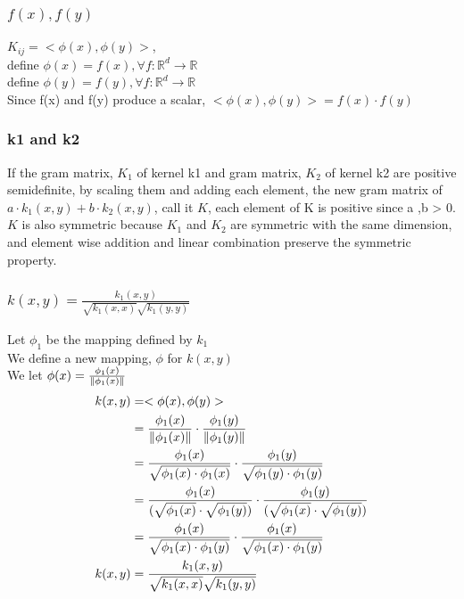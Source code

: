\documentclass[letterpaper, 12]{article}
\begin{document}
\subsubsection{$f(x), f(y)$}
$K_{ij} = <\phi (x),  \phi (y) >$, \\
define $\phi(x) = f(x), \forall f: \mathbb{R}^{d} \rightarrow \mathbb{R}$\\
define $\phi(y) = f(y), \forall f: \mathbb{R}^{d} \rightarrow \mathbb{R}$\\
Since f(x) and f(y) produce a scalar,  $<\phi (x),  \phi (y) > = f(x) \cdot f(y)$

\subsubsection{k1 and k2}
If the gram matrix, $K_{1}$ of kernel k1 and gram matrix, $K_{2}$ of kernel k2 are positive semidefinite, by scaling them and adding each element, the new gram matrix of $a \cdot k_{1}(x, y) + b \cdot k_{2}(x, y)$, call it $K$, each element of K is positive since a ,b > 0.\\
$K$ is also symmetric because $K_{1}$ and $K_{2}$ are symmetric with the same dimension, and element wise addition and linear combination preserve the symmetric property.\\

\subsubsection{$k(x, y) = \frac{k_{1}(x ,y) }{\sqrt{k_{1}(x, x)} \sqrt{k_{1}(y, y)} }$}
Let $\phi_{1}$ be the mapping defined by $k_{1}$\\
We define a new mapping, $\phi$ for $k(x ,y)$\\
We let $\phi(x) = \frac{\phi_{1} (x)}{\norm{\phi_{1}(x)}}$\\
\begin{equation*}
\begin{split}
k(x, y) &= <\phi (x), \phi (y)>\\
&= \frac{\phi_{1}(x)}{\norm{\phi_{1}(x)}} \cdot  \frac{\phi_{1}(y)}{\norm{\phi_{1}(y)}}\\
&= \frac{\phi_{1}(x)}{\sqrt{\phi_{1}(x) \cdot \phi_{1}(x)}} \cdot \frac{\phi_{1}(y)}{\sqrt{\phi_{1}(y) \cdot \phi_{1}(y)}}\\
&= \frac{\phi_{1}(x)}{( \sqrt{\phi_{1}(x)} \cdot \sqrt{ \phi_{1}(y)}  )}  \cdot \frac{\phi_{1}(y)}{( \sqrt{\phi_{1}(x)} \cdot \sqrt{ \phi_{1}(y)}  )} \\
&= \frac{\phi_{1}(x)}{ \sqrt{\phi_{1}(x) \cdot  \phi_{1}(y) }}  \cdot  \frac{\phi_{1}(x)}{ \sqrt{\phi_{1}(x) \cdot  \phi_{1}(y) }}\\
 k(x, y) &= \frac{k_{1}(x ,y) }{\sqrt{k_{1}(x, x)} \sqrt{k_{1}(y, y)} }
\end{split}
\end{equation*}
\end{document}
